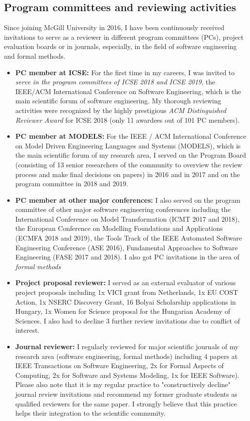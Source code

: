 \subsection{Program committees and reviewing activities}
Since joining McGill University in 2016, I have been continuously received invitations to serve as a reviewer in different program committees (PCs), project evaluation boards or in journals, especially, in the field of software engineering and formal methods. 

\begin{itemize}
\item \textbf{PC member at ICSE:}
For the first time in my careers, I was invited to \emph{serve in the program committees of ICSE 2018 and ICSE 2019}, the IEEE/ACM International Conference on Software Engineering, which is the main scientific forum of software engineering. My thorough reviewing activities were recognized by the highly prestigious \emph{ACM Distinguished Reviewer Award} for ICSE 2018 (only 11 awardees out of 101 PC members). 

\item \textbf{PC member at MODELS:}
For the IEEE / ACM International Conference on Model Driven Engineering Languages and Systems (MODELS), which is the main scientific forum of my research area, I served on the Program Board (consisting of 13 senior researchers of the community to overview the review process and make final decisions on papers) in 2016 and in 2017 and on the program committee in 2018 and 2019. 

\item \textbf{PC member at other major conferences:}
I also served on the program committee of other major software engineering conferences including the 
International Conference on Model Transformation (ICMT 2017 and 2018), the European Conference on Modelling Foundations and Applications (ECMFA 2018 and 2019), the Tools Track of the IEEE Automated Software Engineering Conference (ASE 2016), Fundamental Approaches to Software Engineering (FASE 2017 and 2018). I also got PC invitations in the area of \emph{formal methods}

\item \textbf{Project proposal reviewer:}
I served as an external evaluator of various project proposals including 1x VICI grant from Netherlands, 1x EU COST Action, 1x NSERC Discovery Grant, 16 Bolyai Scholarship applications in Hungary, 1x Women for Science proposal for the Hungarian Academy of Sciences. I also had to decline 3 further review invitations due to conflict of interest.

\item \textbf{Journal reviewer:}
I regularly reviewed for major scientific journals of my research area (software engineering, formal methods) including 4 papers at IEEE Transactions on Software Engineering, 2x for Formal Aspects of Computing, 2x for Software and Systems Modeling, 1x for IEEE Software). Please also note that it is my regular practice to "constructively decline" journal review invitations and recommend my former graduate students as qualified reviewers for the same paper. I strongly believe that this practice helps their integration to the scientific community. 
\end{itemize}

